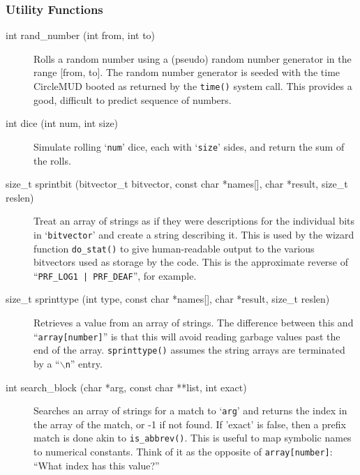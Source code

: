 \documentclass[11pt]{article}
\begin{document}
\subsubsection{Utility Functions}
\begin{description}
\item[int rand\_number (int from, int to)]
Rolls a random number using a (pseudo) random number generator in the range [from, to].  The random number generator is seeded with the time CircleMUD booted as returned by the \texttt{time()} system call.  This provides a good, difficult to predict sequence of numbers.
\item[int dice (int num, int size)]
Simulate rolling `\texttt{num}' dice, each with `\texttt{size}' sides, and return the sum of the rolls.
\item[size\_t sprintbit (bitvector\_t bitvector, const char *names[{]}, char *result, size\_t reslen)]
Treat an array of strings as if they were descriptions for the individual bits in `\texttt{bitvector}' and create a string describing it. This is used by the wizard function \texttt{do\_stat()} to give human-readable output to the various bitvectors used as storage by the code. This is the approximate reverse of ``\texttt{PRF\_LOG1 | PRF\_DEAF}'', for example.
\item[size\_t sprinttype (int type, const char *names[{]}, char *result, size\_t reslen)]
Retrieves a value from an array of strings.  The difference between
this and ``\texttt{array[number]}'' is that this will avoid reading garbage
values past the end of the array.  \texttt{sprinttype()} assumes the string
arrays are terminated by a ``\texttt{$\backslash$n}'' entry.
\item[int search\_block (char *arg, const char **list, int exact)]
Searches an array of strings for a match to `\texttt{arg}' and returns the index in the array of the match, or -1 if not found.  If 'exact' is false, then a prefix match is done akin to \texttt{is\_abbrev()}. This is useful to map symbolic names to numerical constants.  Think of it as the opposite of \texttt{array[number]}: ``What index has this value?''
\end{description}
\end{document}
